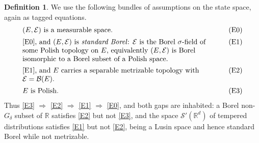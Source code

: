 \documentclass[11pt,a4paper]{article}
\theoremstyle{plain}
\theoremstyle{definition}
\newtheorem{definition}[theorem]{Definition}
\theoremstyle{remark}
\newcommand{\R}{\mathbb{R}}
\newcommand{\Bor}{\mathcal{B}}                 %
\begin{document}
\begin{definition}
  \label{def:Ebundles}
  We use the following bundles of assumptions on the state space, again as tagged
  equations.
  \begin{align}
    &\parbox[t]{0.78\textwidth}{\raggedright
      $(E,\mathcal{E})$ is a measurable space.}
      \tag{E0}\label{E0} \\[0.4ex]
    &\parbox[t]{0.78\textwidth}{\raggedright
      \eqref{E0}, and $(E,\mathcal{E})$ is \emph{standard Borel}: $\mathcal{E}$ is
      the Borel $\sigma$-field of some Polish topology on $E$, equivalently
      $(E,\mathcal{E})$ is Borel isomorphic to a Borel subset of a Polish space.}
      \tag{E1}\label{E1} \\[0.4ex]
    &\parbox[t]{0.78\textwidth}{\raggedright
      \eqref{E1}, and $E$ carries a separable metrizable topology with
      $\mathcal{E} = \Bor(E)$.}
      \tag{E2}\label{E2} \\[0.4ex]
    &\parbox[t]{0.78\textwidth}{\raggedright
      $E$ is Polish.}
      \tag{E3}\label{E3}
  \end{align}
  Thus \eqref{E3} $\Rightarrow$ \eqref{E2} $\Rightarrow$ \eqref{E1}
  $\Rightarrow$ \eqref{E0}, and both gaps are inhabited: a Borel
  non-$G_\delta$ subset of $\R$ satisfies \eqref{E2} but not \eqref{E3}, and the
  space $\mathcal{S}'(\R^d)$ of tempered distributions satisfies \eqref{E1} but
  not \eqref{E2}, being a Lusin space and hence standard Borel while not
  metrizable.
\end{definition}
\end{document}
